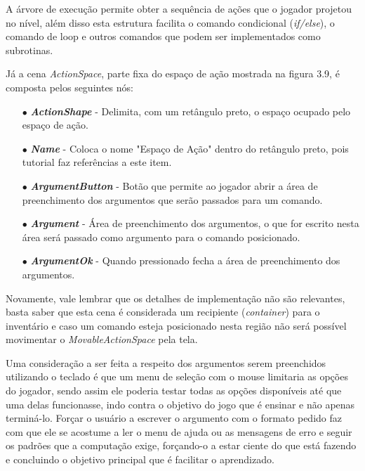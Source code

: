 A árvore de execução permite obter a sequência de ações que o jogador projetou
no nível, além disso esta estrutura facilita o comando condicional 
(\textit{if/else}), o comando de loop e outros comandos que podem ser 
implementados como subrotinas.

Já a cena \textit{ActionSpace}, parte fixa do espaço de ação mostrada na figura
3.9, é composta pelos seguintes nós:

\begin{itemize}
    \item[$\bullet$]
        \textbf{\textit{ActionShape}} - Delimita, com um retângulo preto, o
        espaço ocupado pelo espaço de ação.  
    \item[$\bullet$]
        \textbf{\textit{Name}} - Coloca o nome "Espaço de Ação" dentro do 
        retângulo preto, pois tutorial faz referências a este item. 
    \item[$\bullet$]
        \textbf{\textit{ArgumentButton}} - Botão que permite ao jogador 
        abrir a área de preenchimento dos argumentos que serão passados para um 
        comando.
    \item[$\bullet$]
        \textbf{\textit{Argument}} - Área de preenchimento dos argumentos, 
        o que for escrito nesta área será passado como argumento para o comando
        posicionado.  
    \item[$\bullet$]
        \textbf{\textit{ArgumentOk}} - Quando pressionado fecha a área de 
        preenchimento dos argumentos.
\end{itemize}

Novamente, vale lembrar que os detalhes de implementação não são relevantes, 
basta saber que esta cena é considerada um recipiente (\textit{container}) para 
o inventário e caso um comando esteja posicionado nesta região não será possível
movimentar o \textit{MovableActionSpace} pela tela.

Uma consideração a ser feita a respeito dos argumentos serem preenchidos 
utilizando o teclado é que um menu de seleção com o mouse limitaria as opções
do jogador, sendo assim ele poderia testar todas as opções disponíveis até que 
uma delas funcionasse, indo contra o objetivo do jogo que é ensinar e não apenas 
terminá-lo. Forçar o usuário a escrever o argumento com o formato pedido faz com
que ele se acostume a ler o menu de ajuda ou as mensagens de erro e seguir os 
padrões que a computação exige, forçando-o a estar ciente do que está fazendo e
concluindo o objetivo principal que é facilitar o aprendizado.

